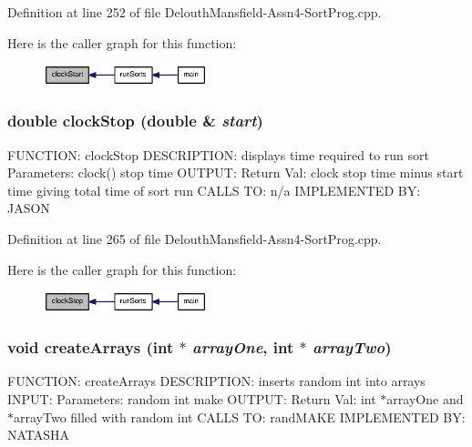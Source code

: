 Definition at line 252 of file DelouthMansfield-\/Assn4-\/SortProg.cpp.



Here is the caller graph for this function:\nopagebreak
\begin{figure}[H]
\begin{center}
\leavevmode
\includegraphics[width=134pt]{_delouth_mansfield-_assn4-_sort_prog_8cpp_a97da3b77b5ebacff9297f22e54185c1a_icgraph}
\end{center}
\end{figure}


\hypertarget{_delouth_mansfield-_assn4-_sort_prog_8cpp_aa5a4dbee524f1aa5d109bcdeeda1b9f6}{
\subsubsection[{clockStop}]{\setlength{\rightskip}{0pt plus 5cm}double clockStop (double \& {\em start})}}
\label{_delouth_mansfield-_assn4-_sort_prog_8cpp_aa5a4dbee524f1aa5d109bcdeeda1b9f6}
FUNCTION: clockStop DESCRIPTION: displays time required to run sort Parameters: clock() stop time OUTPUT: Return Val: clock stop time minus start time giving total time of sort run CALLS TO: n/a IMPLEMENTED BY: JASON 

Definition at line 265 of file DelouthMansfield-\/Assn4-\/SortProg.cpp.



Here is the caller graph for this function:\nopagebreak
\begin{figure}[H]
\begin{center}
\leavevmode
\includegraphics[width=134pt]{_delouth_mansfield-_assn4-_sort_prog_8cpp_aa5a4dbee524f1aa5d109bcdeeda1b9f6_icgraph}
\end{center}
\end{figure}


\hypertarget{_delouth_mansfield-_assn4-_sort_prog_8cpp_af209aad9d447548ca062515ab1acbe3c}{
\subsubsection[{createArrays}]{\setlength{\rightskip}{0pt plus 5cm}void createArrays (int $\ast$ {\em arrayOne}, \/  int $\ast$ {\em arrayTwo})}}
\label{_delouth_mansfield-_assn4-_sort_prog_8cpp_af209aad9d447548ca062515ab1acbe3c}
FUNCTION: createArrays DESCRIPTION: inserts random int into arrays INPUT: Parameters: random int make OUTPUT: Return Val: int $\ast$arrayOne and $\ast$arrayTwo filled with random int CALLS TO: randMAKE IMPLEMENTED BY: NATASHA 

